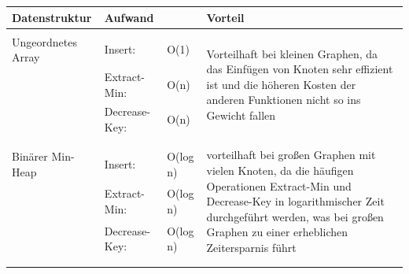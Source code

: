 \documentclass{article}
\begin{document}
\begin{table}[H]
    \centering
    \begin{tabular}{p{3.5cm} p{3cm} p{1.5cm} p{6cm}}
        \textbf{Datenstruktur} & \textbf{Aufwand}  & & \textbf{Vorteil}   \\ \hline \\
        Ungeordnetes Array\index{Array, ungeordnet}& Insert: & O(1)  &  \multirow{3}{*}{\parbox{6cm}{Vorteilhaft bei kleinen Graphen, da das Einfügen von Knoten sehr effizient ist und die höheren Kosten der anderen Funktionen nicht so ins Gewicht fallen}} \\ 
        & Extract-Min: \index{Extract-Min} & O(n) & \\
        & Decrease-Key:\index{Decrease-Key} &  O(n) & \\ \\  \\
        Binärer Min-Heap\index{Heap!binärer} & Insert: & O(log n) & \multirow{3}{*}{\parbox{6cm}{vorteilhaft bei großen Graphen mit vielen Knoten, da die häufigen Operationen Extract-Min und Decrease-Key in logarithmischer Zeit durchgeführt werden, was bei großen Graphen zu einer erheblichen Zeitersparnis führt}} \\
        & Extract-Min: & O(log n) & \\
        & Decrease-Key: & O(log n) & \\ \\ \\
    \end{tabular}
    \label{tab:tab1}
\end{table}

\newpage
\end{document}
